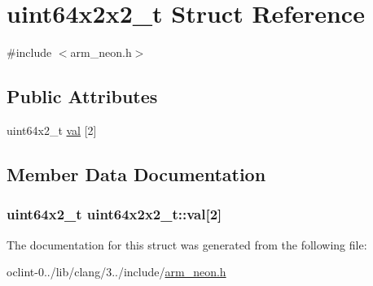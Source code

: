 \hypertarget{structuint64x2x2__t}{\section{uint64x2x2\-\_\-t Struct Reference}
\label{structuint64x2x2__t}
}


{\ttfamily \#include $<$arm\-\_\-neon.\-h$>$}

\subsection*{Public Attributes}
\begin{DoxyCompactItemize}
\item 
uint64x2\-\_\-t \hyperlink{structuint64x2x2__t_a4fa4c56badeeefd397eb1eb945557903}{val} \mbox{[}2\mbox{]}
\end{DoxyCompactItemize}


\subsection{Member Data Documentation}
\hypertarget{structuint64x2x2__t_a4fa4c56badeeefd397eb1eb945557903}{
\subsubsection[{val}]{\setlength{\rightskip}{0pt plus 5cm}uint64x2\-\_\-t uint64x2x2\-\_\-t\-::val\mbox{[}2\mbox{]}}}\label{structuint64x2x2__t_a4fa4c56badeeefd397eb1eb945557903}


The documentation for this struct was generated from the following file\-:\begin{DoxyCompactItemize}
\item 
oclint-\/0../lib/clang/3../include/\hyperlink{arm__neon_8h}{arm\-\_\-neon.\-h}\end{DoxyCompactItemize}
